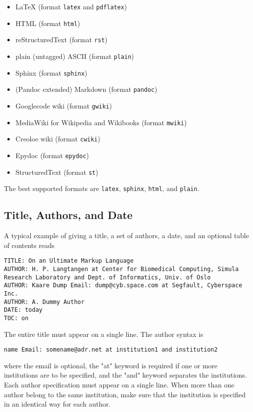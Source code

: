 \documentclass[%
oneside,                 %
final,                   %
10pt]{article}
\begin{document}
\begin{itemize}
 \item {\LaTeX} (format \Verb!latex! and \Verb!pdflatex!)

 \item HTML (format \Verb!html!)

 \item reStructuredText (format \Verb!rst!)

 \item plain (untagged) ASCII (format \Verb!plain!)

 \item Sphinx (format \Verb!sphinx!)

 \item (Pandoc extended) Markdown (format \Verb!pandoc!)

 \item Googlecode wiki (format \Verb!gwiki!)

 \item MediaWiki for Wikipedia and Wikibooks (format \Verb!mwiki!)

 \item Creoloe wiki (format \Verb!cwiki!)

 \item Epydoc (format \Verb!epydoc!)

 \item StructuredText (format \Verb!st!)
\end{itemize}

\noindent
The best supported formats are \Verb!latex!, \Verb!sphinx!, \Verb!html!, and \Verb!plain!.

\subsection{Title, Authors, and Date}

A typical example of giving a title, a set of authors, a date,
and an optional table of contents
reads
\begin{Verbatim}[numbers=none,fontsize=\fontsize{9pt}{9pt},baselinestretch=0.85,xleftmargin=0mm]
TITLE: On an Ultimate Markup Language
AUTHOR: H. P. Langtangen at Center for Biomedical Computing, Simula Research Laboratory and Dept. of Informatics, Univ. of Oslo
AUTHOR: Kaare Dump Email: dump@cyb.space.com at Segfault, Cyberspace Inc.
AUTHOR: A. Dummy Author
DATE: today
TOC: on
\end{Verbatim}
The entire title must appear on a single line.
The author syntax is
\begin{Verbatim}[numbers=none,fontsize=\fontsize{9pt}{9pt},baselinestretch=0.85,xleftmargin=0mm]
name Email: somename@adr.net at institution1 and institution2
\end{Verbatim}
where the email is optional, the "at" keyword is required if one or
more institutions are to be specified, and the "and" keyword
separates the institutions. Each author specification must appear
on a single line.
When more than one author belong to the
same institution, make sure that the institution is specified in an identical
way for each author.
\end{document}
